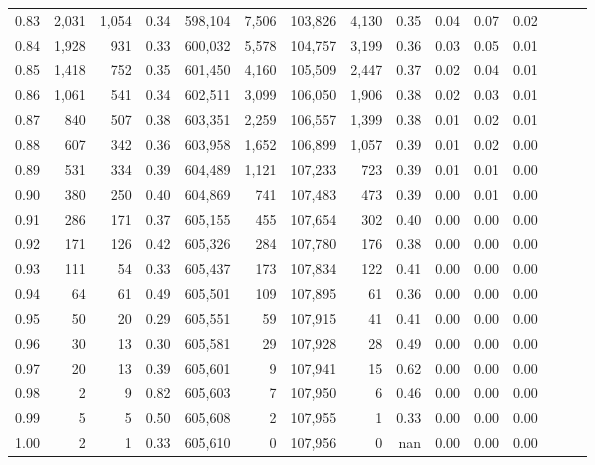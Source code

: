 \begin{tabular}{rrrrrrrrrrrrrrr}
0.83 &   2,031 &  1,054 &  0.34 &  598,104 &    7,506 &  103,826 &    4,130 &  0.35 &  0.04 &  0.07 &      0.02 \\
0.84 &   1,928 &    931 &  0.33 &  600,032 &    5,578 &  104,757 &    3,199 &  0.36 &  0.03 &  0.05 &      0.01 \\
0.85 &   1,418 &    752 &  0.35 &  601,450 &    4,160 &  105,509 &    2,447 &  0.37 &  0.02 &  0.04 &      0.01 \\
0.86 &   1,061 &    541 &  0.34 &  602,511 &    3,099 &  106,050 &    1,906 &  0.38 &  0.02 &  0.03 &      0.01 \\
0.87 &     840 &    507 &  0.38 &  603,351 &    2,259 &  106,557 &    1,399 &  0.38 &  0.01 &  0.02 &      0.01 \\
0.88 &     607 &    342 &  0.36 &  603,958 &    1,652 &  106,899 &    1,057 &  0.39 &  0.01 &  0.02 &      0.00 \\
0.89 &     531 &    334 &  0.39 &  604,489 &    1,121 &  107,233 &      723 &  0.39 &  0.01 &  0.01 &      0.00 \\
0.90 &     380 &    250 &  0.40 &  604,869 &      741 &  107,483 &      473 &  0.39 &  0.00 &  0.01 &      0.00 \\
0.91 &     286 &    171 &  0.37 &  605,155 &      455 &  107,654 &      302 &  0.40 &  0.00 &  0.00 &      0.00 \\
0.92 &     171 &    126 &  0.42 &  605,326 &      284 &  107,780 &      176 &  0.38 &  0.00 &  0.00 &      0.00 \\
0.93 &     111 &     54 &  0.33 &  605,437 &      173 &  107,834 &      122 &  0.41 &  0.00 &  0.00 &      0.00 \\
0.94 &      64 &     61 &  0.49 &  605,501 &      109 &  107,895 &       61 &  0.36 &  0.00 &  0.00 &      0.00 \\
0.95 &      50 &     20 &  0.29 &  605,551 &       59 &  107,915 &       41 &  0.41 &  0.00 &  0.00 &      0.00 \\
0.96 &      30 &     13 &  0.30 &  605,581 &       29 &  107,928 &       28 &  0.49 &  0.00 &  0.00 &      0.00 \\
0.97 &      20 &     13 &  0.39 &  605,601 &        9 &  107,941 &       15 &  0.62 &  0.00 &  0.00 &      0.00 \\
0.98 &       2 &      9 &  0.82 &  605,603 &        7 &  107,950 &        6 &  0.46 &  0.00 &  0.00 &      0.00 \\
0.99 &       5 &      5 &  0.50 &  605,608 &        2 &  107,955 &        1 &  0.33 &  0.00 &  0.00 &      0.00 \\
1.00 &       2 &      1 &  0.33 &  605,610 &        0 &  107,956 &        0 &   nan &  0.00 &  0.00 &      0.00 \\
\bottomrule
\end{tabular}
